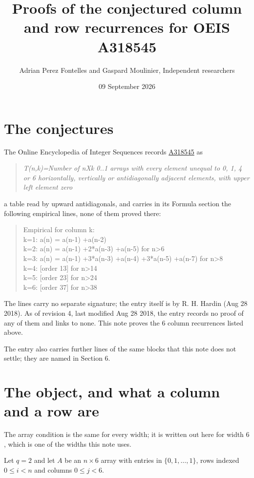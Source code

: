 \documentclass[11pt]{article}
\title{Proofs of the conjectured column and row recurrences for OEIS A318545}
\author{Adrian Perez Fontelles and Gaspard Moulinier, Independent researchers}
\date{09 September 2026}
\theoremstyle{definition}
\begin{document}
\maketitle
\section{The conjectures}

The Online Encyclopedia of Integer Sequences records \href{https://oeis.org/A318545}{A318545} as

\begin{quote}\itshape T(n,k)=Number of nXk 0..1 arrays with every element unequal to 0, 1, 4 or 6 horizontally, vertically or antidiagonally adjacent elements, with upper left element zero\end{quote}

a table read by upward antidiagonals, and carries in its Formula section the following empirical lines, none of them proved there:

\begin{quote}\ttfamily Empirical for column k:\\
k=1: a(n) = a(n-1) +a(n-2)\\k=2: a(n) = a(n-1) +2*a(n-3) +a(n-5) for n>6\\k=3: a(n) = a(n-1) +3*a(n-3) +a(n-4) +3*a(n-5) +a(n-7) for n>8\\k=4: [order 13] for n>14\\k=5: [order 23] for n>24\\k=6: [order 37] for n>38\end{quote}

The lines carry no separate signature; the entry itself is by R. H. Hardin (Aug 28 2018). As of revision 4, last modified Aug 28 2018, the entry records no proof of any of them and links to none. This note proves the 6 column recurrences listed above.

The entry also carries further lines of the same blocks that this note does not settle; they are named in Section 6.

\section{The object, and what a column and a row are}

The array condition is the same for every width; it is written out here for width $6$, which is one of the widths this note uses.

Let $q = 2$ and let $A$ be an $n \times 6$ array with entries in $\{0,1,\dots,1\}$, rows indexed $0 \le i < n$ and columns $0 \le j < 6$.
\end{document}
